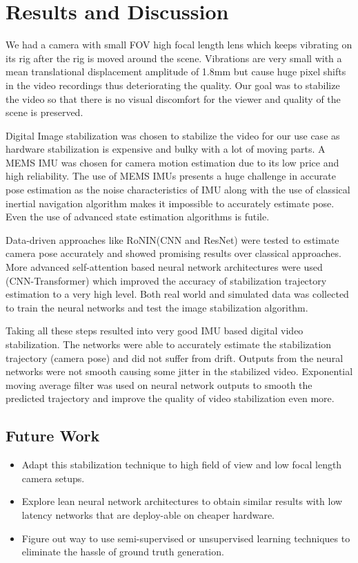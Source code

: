 \chapter{Results and Discussion} \label{chapter_five}

We had a camera with small FOV high focal length lens which keeps vibrating on its rig after the rig is moved around the scene. Vibrations are very small with a mean translational displacement amplitude of 1.8mm but cause huge pixel shifts in the video recordings thus deteriorating the quality. Our goal was to stabilize the video so that there is no visual discomfort for the viewer and quality of the scene is preserved.
    
Digital Image stabilization was chosen to stabilize the video for our use case as hardware stabilization is expensive and bulky with a lot of moving parts. A MEMS IMU was chosen for camera motion estimation due to its low price and high reliability. The use of MEMS IMUs presents a huge challenge in accurate pose estimation as the noise characteristics of IMU along with the use of classical inertial navigation algorithm makes it impossible to accurately estimate pose. Even the use of advanced state estimation algorithms is futile.

Data-driven approaches like RoNIN(CNN and ResNet) were tested to estimate camera pose accurately and showed promising results over classical approaches. More advanced self-attention based neural network architectures were used (CNN-Transformer) which improved the accuracy of stabilization trajectory estimation to a very high level. Both real world and simulated data was collected to train the neural networks and test the image stabilization algorithm.

Taking all these steps resulted into very good IMU based digital video stabilization. The networks were able to accurately estimate the stabilization trajectory (camera pose) and did not suffer from drift. Outputs from the neural networks were not smooth causing some jitter in the stabilized video. Exponential moving average filter was used on neural network outputs to smooth the predicted trajectory and improve the quality of video stabilization even more.

\section{Future Work}
\begin{itemize}
    \item Adapt this stabilization technique to high field of view and low focal length camera setups.

    \item Explore lean neural network architectures to obtain similar results with low latency networks that are deploy-able on cheaper hardware.

    \item Figure out way to use semi-supervised or unsupervised learning techniques to eliminate the hassle of ground truth generation.
    
\end{itemize}
